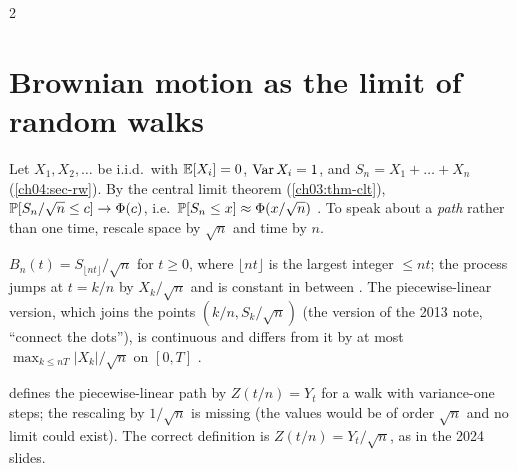 \begin{paracol}{2}
\section{Brownian motion as the limit of random walks}\label{ch11:sec-donsker}

Let $X_1,X_2,\dots$ be i.i.d.\ with $\mathbb{E}[X_i]=0$, $\operatorname{Var} X_i=1$, and $S_n=X_1+\dots+X_n$
(\cref{ch04:sec-rw}). By the central limit theorem (\cref{ch03:thm-clt}), $\mathbb{P}[S_n/\sqrt n\le c]\to\Phi(c)$, i.e.\ $\mathbb{P}[S_n\le x]\approx\Phi(x/\sqrt n)$
. To speak about a \emph{path} rather than one time, rescale space by $\sqrt n$ and time by $n$.

\begin{definition}\label{ch11:def-bn}
$B_n(t)=S_{\lfloor nt\rfloor}/\sqrt n$ for $t\ge0$, where $\lfloor nt\rfloor$ is the largest integer $\le nt$; the process jumps at
$t=k/n$ by $X_k/\sqrt n$ and is constant in between . The piecewise-linear version, which joins the points
$(k/n,S_k/\sqrt n)$ (the version of the 2013 note, ``connect the dots''), is continuous and differs from it by at most
$\max_{k\le nT}|X_k|/\sqrt n$ on $[0,T]$ .
\end{definition}

\begin{coursenote}
 defines the piecewise-linear path by $Z(t/n)=Y_t$ for a walk with variance-one steps; the rescaling by $1/\sqrt n$ is missing (the
values would be of order $\sqrt n$ and no limit could exist). The correct definition is $Z(t/n)=Y_t/\sqrt n$, as in the 2024 slides.
\end{coursenote}


\end{paracol}
